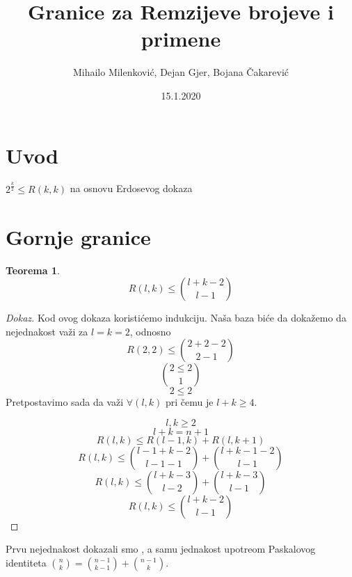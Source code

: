 \documentclass{article}
\title{Granice za Remzijeve brojeve i primene}
\date{15.1.2020}
\author{Mihailo Milenković, Dejan Gjer, Bojana Čakarević}
\theoremstyle{definition}
\newtheorem{teorema}{Teorema}[section]
\newcommand{\dokaz}[1]{\begin{proof}[Dokaz]#1\end{proof}}
\begin{document}
	
	\maketitle
	
	\newpage
	
	\tableofcontents
	
	\newpage
	
	\section{Uvod}
	
	$ 2^{\frac{k}{2}} \leq R(k,k)$ na osnovu Erdosevog dokaza \cite{theBook}
	
	\lipsum[1]

	\newpage
	\section{Gornje granice}
	
	\begin{teorema}
\[R(l,k) \leq {l+k-2\choose l-1} 
\]
\end{teorema}
\dokaz{
Kod ovog dokaza koristićemo indukciju. Naša baza biće da dokažemo da nejednakost važi za $l=k=2$, odnosno
\[ R(2,2) \leq {2+2-2 \choose 2-1}
\]
\[
2 \leq 2 \choose 1
\]
\[
2 \leq 2
\]
Pretpostavimo sada da važi $\forall(l,k)$  pri čemu je $l+k \geq 4$.

\[l,k \geq 2
\]
\[
l+k=n+1
\]
\[
R(l,k) \leq R(l-1, k) + R(l, k+1)
\]
\[
R(l,k) \leq {{l-1+k-2 \choose l-1-1} + {l+k-1-2 \choose l-1}}
\]
\[
R(l,k) \leq {{l+k-3 \choose l-2} + {l+k-3 \choose l-1}}
\]
\[
R(l,k) \leq {l+k-2 \choose l-1}
\]
}
Prvu nejednakost dokazali smo %
, a samu jednakost upotreom Paskalovog identiteta ${n \choose k} = {n-1 \choose k-1} + {n-1 \choose k}$.
	
\end{document}
